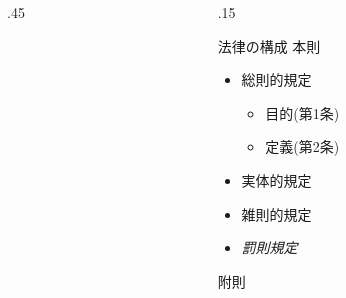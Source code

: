 \begin{columns}[onlytextwidth,t]
\begin{column}{.45\hsize}
\end{column}
\begin{column}{.15\hsize}
\begin{block}{法律の構成\cite{sangiin}}
本則
\begin{itemize}
\item 総則的規定
	\begin{itemize}
	\item \alert{目的}(第1条)
	\item \alert{定義}(第2条)
	\end{itemize}
\item 実体的規定
\item 雑則的規定
\item \em{罰則}規定
\end{itemize}
附則
\end{block}
\end{column}
\end{columns}


